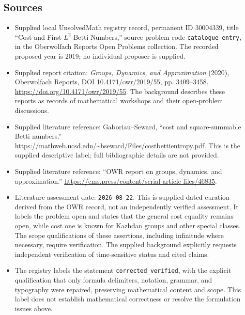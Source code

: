 \documentclass[11pt]{article}
\begin{document}
\subsection{Sources}
\begin{itemize}
\item Supplied local UnsolvedMath registry record, permanent ID \(30004339\), title ``Cost and First \(L^2\) Betti Numbers,'' source problem code \texttt{catalogue entry}, in the Oberwolfach Reports Open Problems collection. The recorded proposed year is 2019; no individual proposer is supplied.
\item Supplied report citation: \emph{Groups, Dynamics, and Approximation} (2020), Oberwolfach Reports, DOI 10.4171/owr/2019/55, pp. 3409--3458. \url{https://doi.org/10.4171/owr/2019/55}. The background describes these reports as records of mathematical workshops and their open-problem discussions.
\item Supplied literature reference: Gaboriau--Seward, ``cost and square-summable Betti numbers.'' \url{https://mathweb.ucsd.edu/~bseward/Files/costbettientropy.pdf}. This is the supplied descriptive label; full bibliographic details are not provided.
\item Supplied literature reference: ``OWR report on groups, dynamics, and approximation.'' \url{https://ems.press/content/serial-article-files/46835}.
\item Literature assessment date: \texttt{2026-08-22}. This is supplied dated curation derived from the OWR record, not an independently verified assessment. It labels the problem open and states that the general cost equality remains open, while cost one is known for Kazhdan groups and other special classes. The scope qualifications of these assertions, including infinitude where necessary, require verification. The supplied background explicitly requests independent verification of time-sensitive status and cited claims.
\item The registry labels the statement \texttt{corrected\_verified}, with the explicit qualification that only formula delimiters, notation, grammar, and typography were repaired, preserving mathematical content and scope. This label does not establish mathematical correctness or resolve the formulation issues above.
\end{itemize}
\end{document}
